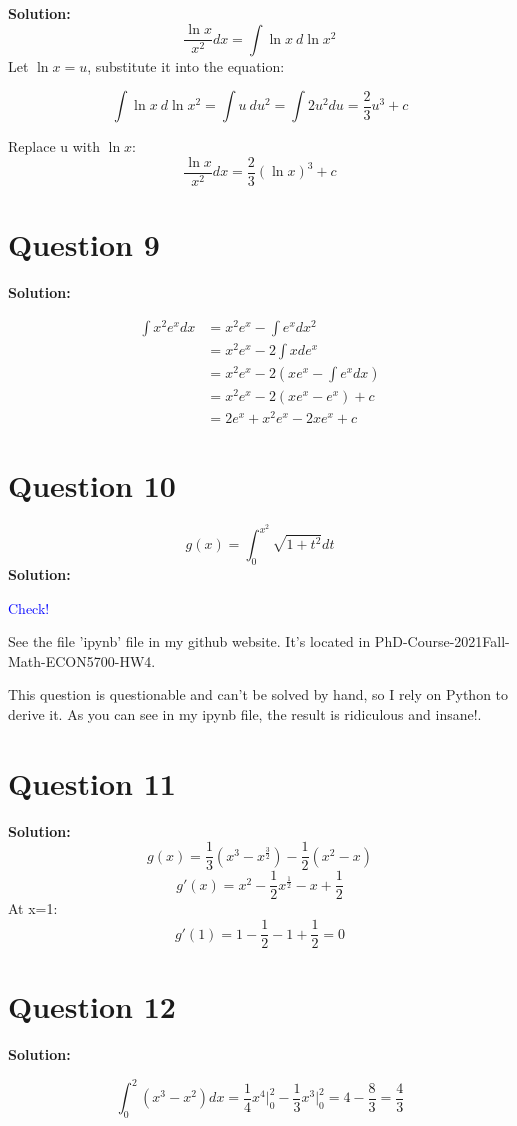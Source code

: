 \documentclass[11pt]{article} %
\begin{document}
\textbf{Solution:}
$$\frac{\ln x}{x^2}dx=\int \ln x \ d\ln x^2$$
Let $\ln x=u$, substitute it into the equation:

$$\int \ln x \ d\ln x^2=\int u \ du^2=\int 2u^2 du= \frac{2}{3}u^3+c$$

Replace u with $\ln x$:
$$\frac{\ln x}{x^2}dx=\frac{2}{3}(\ln x)^3+c$$

\section{Question 9}
\textbf{Solution:}

\begin{align*}
	\int x^2 e^x dx &= x^2e^x-\int e^x dx^2\\
									&= x^2e^x-2\int x de^x\\
									&=x^2e^x-2(xe^x-\int e^x dx)\\
									&= x^2e^x-2(xe^x-e^x)+c\\
									&=2e^x+x^2e^x-2xe^x+c
\end{align*}

\section{Question 10}
$$g(x)=\int_{0}^{x^2}\sqrt{1+t^2}dt$$
\textbf{Solution:}

\textcolor{blue}{Check!}

See the file 'ipynb' file in my github website. It's located in  PhD-Course-2021Fall-Math-ECON5700-HW4. 

This question is questionable and can't be solved by hand, so I rely on Python to derive it. As you can see in my ipynb file, the result is ridiculous and insane!.




\section{Question 11}

\textbf{Solution:}
$$g(x)=\frac{1}{3}(x^3-x^{\frac{3}{2}})-\frac{1}{2}(x^2-x)$$
$$g'(x)=x^2-\frac{1}{2}x^{\frac{1}{2}}-x+\frac{1}{2}$$
At x=1:
$$g'(1)=1-\frac{1}{2}-1+\frac{1}{2}=0$$

\section{Question 12}

\textbf{Solution:}

	
$$\int_{0}^{2}(x^3-x^2)dx = \frac{1}{4}x^4 \bigg|_0^2-\frac{1}{3}x^3\bigg|_0^2 = 4-\frac{8}{3}= \frac{4}{3}$$
\end{document}

